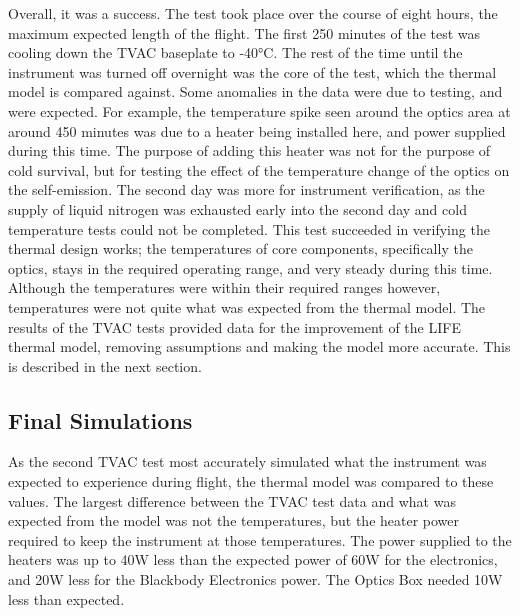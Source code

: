Overall, it was a success. The test took place over the course of eight hours, the maximum expected length of the flight. The first 250 minutes of the test was cooling down the TVAC baseplate to -40°C. The rest of the time until the instrument was turned off overnight was the core of the test, which the thermal model is compared against. Some anomalies in the data were due to testing, and were expected. For example, the temperature spike seen around the optics area at around 450 minutes was due to a heater being installed here, and power supplied during this time. The purpose of adding this heater was not for the purpose of cold survival, but for testing the effect of the temperature change of the optics on the self-emission. The second day was more for instrument verification, as the supply of liquid nitrogen was exhausted early into the second day and cold temperature tests could not be completed. This test succeeded in verifying the thermal design works; the temperatures of core components, specifically the optics, stays in the required operating range, and very steady during this time. Although the temperatures were within their required ranges however, temperatures were not quite what was expected from the thermal model. The results of the TVAC tests provided data for the improvement of the LIFE thermal model, removing assumptions and making the model more accurate. This is described in the next section.

\subsection{Final Simulations}\label{final_pre_flight_sims}
As the second TVAC test most accurately simulated what the instrument was expected to experience during flight, the thermal model was compared to these values. The largest difference between the TVAC test data and what was expected from the model was not the temperatures, but the heater power required to keep the instrument at those temperatures. The power supplied to the heaters was up to 40W less than the expected power of 60W for the electronics, and 20W less for the Blackbody Electronics power. The Optics Box needed 10W less than expected.

